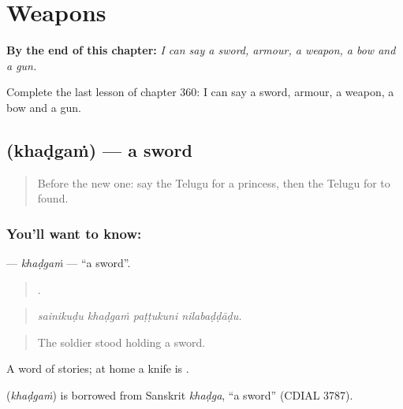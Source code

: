 
\chapter{Weapons}
\label{ch:te-weapons}

\begin{chapteropening}
\textbf{By the end of this chapter:} \emph{I can say a sword, armour, a weapon, a bow and a gun.}

Complete the last lesson of chapter 360: I can say a sword, armour, a weapon, a bow and a gun.
\end{chapteropening}

\section[\texorpdfstring{\te{ఖడ్గం} (khaḍgaṁ)}{ఖడ్గం (khaḍgaṁ)}]{ (khaḍgaṁ) — a sword}

\label{lesson:TE-C360-khadgam}



\begin{quote}
Before the new one: say the Telugu for a princess, then the Telugu for to found.
\end{quote}

\subsection*{You'll want to know: }
\textbf{} — \emph{khaḍgaṁ} — \textquotedblleft{}a sword\textquotedblright{}.

\begin{quote}
   .
\end{quote}

\begin{quote}
\emph{sainikuḍu khaḍgaṁ paṭṭukuni nilabaḍḍāḍu.}
\end{quote}

\begin{quote}
The soldier stood holding a sword.
\end{quote}

A word of stories; at home a knife is .

\begin{cousinweb}
\textbf{} (\emph{khaḍgaṁ}) is borrowed from Sanskrit \emph{khaḍga}, \textquotedblleft{}a sword\textquotedblright{} (CDIAL 3787).
\end{cousinweb}

